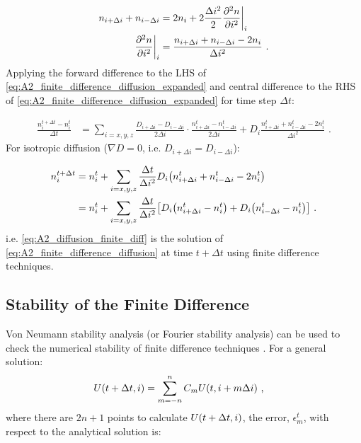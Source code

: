 \begin{equation}
    \begin{aligned}
        n_{i+\Delta i}+n_{i-\Delta i} &=2n_{i} + 2\frac{\Delta i^2}{2}\pdv[2]{n}{i}\bigg|_{i} \\
        \pdv[2]{n}{i} \bigg|_{i}&=\frac{n_{i+\Delta i}+n_{i-\Delta i}-2n_i}{\Delta i^2}\text{ .} 
    \end{aligned}
\end{equation}
\noindent Applying the forward difference to the LHS of \autoref{eq:A2_finite_difference_diffusion_expanded} and central difference to the RHS of \autoref{eq:A2_finite_difference_diffusion_expanded} for time step $\Delta t$:

\begin{equation}
    \begin{aligned}
    \frac{n_i^{t+\Delta t}-n_i^t}{\Delta t}&=\sum_{i=x,y,z}\frac{D_{i+\Delta i}-D_{i-\Delta i}}{2\Delta i}\cdot \frac{n_{i+\Delta i}^t-n_{i-\Delta i}^t}{2\Delta i}+D_i\frac{n_{i+\Delta i}^t+n_{i-\Delta i}^t-2n_i^t}{\Delta i^2}\text{ .} 
    \end{aligned}
\end{equation}
\noindent For isotropic diffusion ($\nabla D=0$, i.e. $D_{i+\Delta i}=D_{i-\Delta i}$):

\begin{equation}
    \begin{aligned}
    n_i^{t+\Delta t}&=n_i^t+\sum_{i=x,y,z}\frac{\Delta t}{\Delta i^2}D_i\qty(n_{i+\Delta i}^t+n_{i-\Delta i}^t-2n_i^t) \\
    &=n_i^t+\sum_{i=x,y,z} \frac{\Delta t}{\Delta i^2}\qty[D_i\qty(n_{i+\Delta i}^t-n_i^t)+D_i\qty(n_{i-\Delta i}^t-n_i^t)]\text{ .} 
    \end{aligned} \label{eq:A2_diffusion_finite_diff}
\end{equation}
\noindent i.e. \autoref{eq:A2_diffusion_finite_diff} is the solution of \autoref{eq:A2_finite_difference_diffusion} at time $t+\Delta t$ using finite difference techniques.

\subsection{Stability of the Finite Difference} \label{sec:A2_finite_stability}

Von Neumann stability analysis (or Fourier stability analysis) can be used to check the numerical stability of finite difference techniques \citep{alma9929637001811}. For a general solution:
\begin{equation}
    \begin{aligned}
        U\qty(t+\Delta t, i)&=\sum_{m=-n}^n C_m U\qty(t,i+m\Delta i)\text{ ,} 
    \end{aligned} \label{eq:A3_von_newmann_example}
\end{equation}
\noindent where there are $2n+1$ points to calculate $U\qty(t+\Delta t, i)$, the error, $\epsilon_m^t$, with respect to the analytical solution is:

